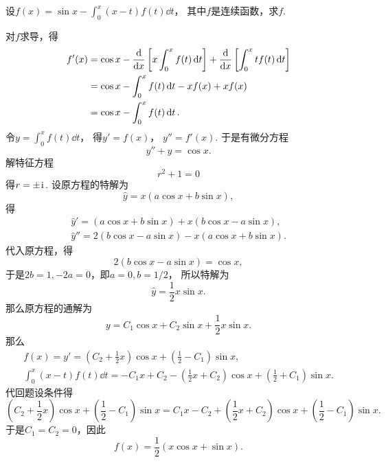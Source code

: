 \begin{example}
设\(f(x) = \sin x - \int_0^x (x-t) f(t) \dd{t}\)，
其中\(f\)是连续函数，求\(f\).
\begin{solution}
对\(f\)求导，得\begin{align*}
	f'(x)
	&= \cos x - \dv{x}\left[ x \int_0^x f(t) \dd{t} \right]
		+ \dv{x}\left[\int_0^x t f(t) \dd{t}\right] \\
	&= \cos x - \int_0^x f(t) \dd{t} - x f(x) + x f(x) \\
	&= \cos x - \int_0^x f(t) \dd{t}.
\end{align*}
令\(y = \int_0^x f(t) \dd{t}\)，
得\(y' = f(x)\)，
\(y'' = f'(x)\).
于是有微分方程\begin{equation*}
	y'' + y = \cos x.
\end{equation*}
解特征方程\begin{equation*}
	r^2 + 1 = 0
\end{equation*}
得\(r = \pm\kern1pt\mathrm{i}\kern1pt\).
设原方程的特解为\begin{equation*}
	\hat{y} = x(a \cos x + b \sin x),
\end{equation*}
得\begin{gather*}
	\hat{y}' = (a \cos x + b \sin x)
				+ x(b \cos x - a \sin x), \\
	\hat{y}'' = 2(b \cos x - a \sin x)
				- x(a \cos x + b \sin x).
\end{gather*}
代入原方程，得\begin{equation*}
	2(b \cos x - a \sin x)
	= \cos x,
\end{equation*}
于是\(2b = 1, -2a = 0\)，即\(a=0, b=1/2\)，
所以特解为\begin{equation*}
	\hat{y} = \frac{1}{2} x \sin x.
\end{equation*}
那么原方程的通解为\begin{equation*}
	y = C_1 \cos x + C_2 \sin x + \frac{1}{2} x \sin x.
\end{equation*}
那么\begin{gather*}
	f(x) = y'
	= \left( C_2 + \frac{1}{2} x \right) \cos x
	+ \left( \frac{1}{2} - C_1 \right) \sin x, \\
	\int_0^x (x-t) f(t) \dd{t}
	= -C_1 x + C_2 - \left(\frac{1}{2}x+C_2\right) \cos x
	+ \left(\frac{1}{2}+C_1\right) \sin x.
\end{gather*}
代回题设条件得\begin{equation*}
	\left( C_2 + \frac{1}{2} x \right) \cos x
	+ \left( \frac{1}{2} - C_1 \right) \sin x
	= C_1 x - C_2 + \left(\frac{1}{2} x + C_2\right) \cos x
	+ \left(\frac{1}{2}-C_1\right) \sin x.
\end{equation*}
于是\(C_1 = C_2 = 0\)，因此\begin{equation*}
	f(x) = \frac{1}{2} (x \cos x + \sin x).
\end{equation*}
\end{solution}
\end{example}
